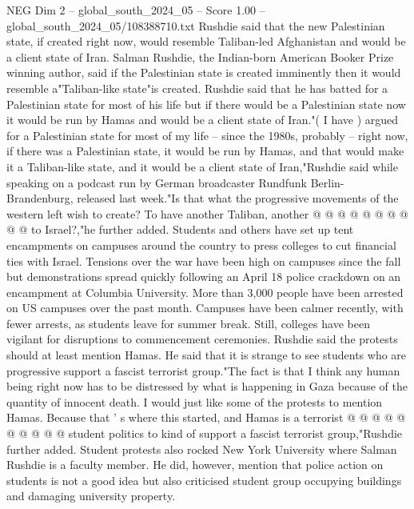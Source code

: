 \begin{textsample}{NEG Dim 2 – global\_south\_2024\_05 – Score 1.00 – global\_south\_2024\_05/108388710.txt}  \label{ex:f2_neg_376}
Rushdie said that the new Palestinian state, if created right now, would resemble Taliban-led Afghanistan and would be a client state of Iran.
Salman Rushdie, the Indian-born American Booker Prize winning author, said if the Palestinian state is created imminently then it would resemble a"Taliban-like state"is created.
Rushdie said that he has batted for a Palestinian state for most of his life but if there would be a Palestinian state now it would be run by Hamas and would be a client state of Iran."( I have ) argued for a Palestinian state for most of my life -- since the 1980s, probably -- right now, if there was a Palestinian state, it would be run by Hamas, and that would make it a Taliban-like state, and it would be a client state of Iran,"Rushdie said while speaking on a podcast run by German broadcaster Rundfunk Berlin-Brandenburg, released last week."Is that what the progressive movements of the western left wish to create?
To have another Taliban, another @ @ @ @ @ @ @ @ @ @ to Israel?,"he further added.
Students and others have set up tent encampments on campuses around the country to press colleges to cut financial ties with Israel.
Tensions over the war have been high on campuses since the fall but demonstrations spread quickly following an April 18 police crackdown on an encampment at Columbia University.
More than 3,000 people have been arrested on US campuses over the past month.
Campuses have been calmer recently, with fewer arrests, as students leave for summer break.
Still, colleges have been vigilant for disruptions to commencement ceremonies.
Rushdie said the protests should at least mention Hamas.
He said that it is strange to see students who are progressive support a fascist terrorist group."The fact is that I think any human being right now has to be distressed by what is happening in Gaza because of the quantity of innocent death.
I would just like some of the protests to mention Hamas.
Because that ' s where this started, and Hamas is a terrorist @ @ @ @ @ @ @ @ @ @ student politics to kind of support a fascist terrorist group,"Rushdie further added.
Student protests also rocked New York University where Salman Rushdie is a faculty member.
He did, however, mention that police action on students is not a good idea but also criticised student group occupying buildings and damaging university property.

\end{textsample}
